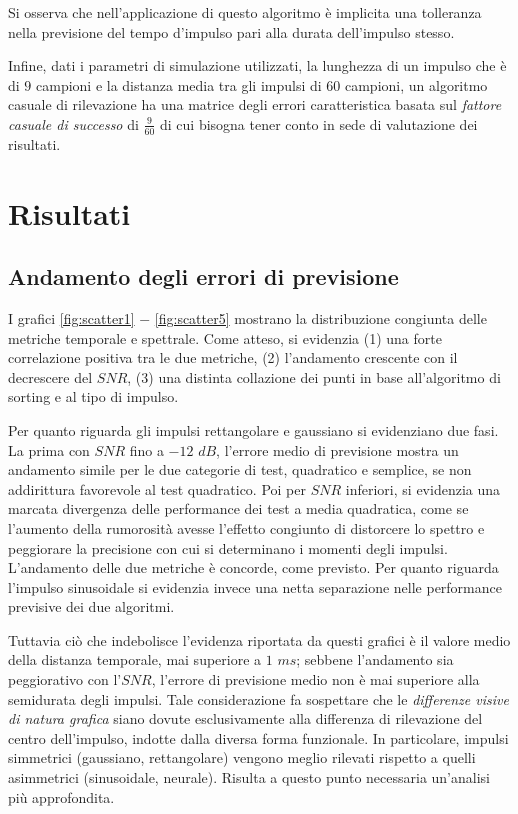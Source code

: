 Si osserva che nell'applicazione di questo algoritmo è implicita una tolleranza nella previsione del tempo d'impulso pari alla durata dell'impulso stesso.

Infine, dati i parametri di simulazione utilizzati, la lunghezza di un impulso che è di $9$ campioni e la distanza media tra gli impulsi di $60$ campioni, un algoritmo casuale di rilevazione ha una matrice degli errori caratteristica basata sul {\it fattore casuale di successo} di $\frac{9}{60}$ di cui bisogna tener conto in sede di valutazione dei risultati. 




\chapter{Risultati}
\section{Andamento degli errori di previsione}
\label{risultati}

I grafici \ref{fig:scatter1} $-$ \ref{fig:scatter5} mostrano la distribuzione congiunta delle metriche temporale e spettrale. Come atteso, si evidenzia (1) una forte correlazione positiva tra le due metriche, (2) l'andamento crescente con il decrescere del $SNR$, (3) una distinta collazione dei punti in base all'algoritmo di sorting e al tipo di impulso.

Per quanto riguarda gli impulsi rettangolare e gaussiano si evidenziano due fasi. La prima con $SNR$ fino a $-12$ $dB$, l'errore medio di previsione mostra un andamento simile per le due categorie di test, quadratico e semplice, se non addirittura favorevole al test quadratico. Poi per $SNR$ inferiori, si evidenzia una marcata divergenza delle performance dei test a media quadratica, come se l'aumento della rumorosità avesse l'effetto congiunto di distorcere lo spettro e peggiorare la precisione con cui si determinano i momenti degli impulsi. L'andamento delle due metriche è concorde, come previsto. Per quanto riguarda l'impulso sinusoidale si evidenzia invece una netta separazione nelle performance previsive dei due algoritmi.

Tuttavia ciò che indebolisce l'evidenza riportata da questi grafici è il valore medio della distanza temporale, mai superiore a $1$ $ms$; sebbene l'andamento sia peggiorativo con l'$SNR$, l'errore di previsione medio non è mai superiore alla semidurata degli impulsi. Tale considerazione fa sospettare che le {\it differenze visive di natura grafica} siano dovute esclusivamente alla differenza di rilevazione del centro dell'impulso, indotte dalla diversa forma funzionale. In particolare, impulsi simmetrici (gaussiano, rettangolare) vengono meglio rilevati rispetto a quelli asimmetrici (sinusoidale, neurale). Risulta a questo punto necessaria un'analisi più approfondita.


